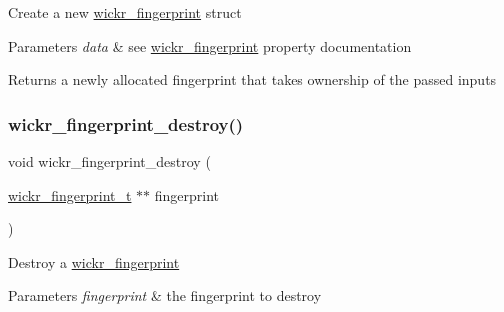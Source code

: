 Create a new \mbox{\hyperlink{structwickr__fingerprint}{wickr\+\_\+fingerprint}} struct


\begin{DoxyParams}{Parameters}
{\em data} & see \textquotesingle{}\mbox{\hyperlink{structwickr__fingerprint}{wickr\+\_\+fingerprint}}\textquotesingle{} property documentation \\
\hline
\end{DoxyParams}
\begin{DoxyReturn}{Returns}
a newly allocated fingerprint that takes ownership of the passed inputs 
\end{DoxyReturn}
\mbox{\label{group__wickr__fingerprint_ga7d3600525872a1d587b2774db7b8b12a}} 
\subsubsection{\texorpdfstring{wickr\+\_\+fingerprint\+\_\+destroy()}{wickr\_fingerprint\_destroy()}}
{\footnotesize\ttfamily void wickr\+\_\+fingerprint\+\_\+destroy (\begin{DoxyParamCaption}\item[{\mbox{\hyperlink{structwickr__fingerprint}{wickr\+\_\+fingerprint\+\_\+t}} $\ast$$\ast$}]{fingerprint }\end{DoxyParamCaption})}

Destroy a \mbox{\hyperlink{structwickr__fingerprint}{wickr\+\_\+fingerprint}}


\begin{DoxyParams}{Parameters}
{\em fingerprint} & the fingerprint to destroy \\
\hline
\end{DoxyParams}
\mbox{\label{group__wickr__fingerprint_gac4791ddf5ea675508dd6627ebf33c62e}} 
